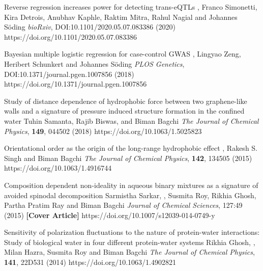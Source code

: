 


\begin{cvpubs}

%
        {Reverse regression increases power for detecting trans-eQTLs}
        {\selfauthor{}, Franco Simonetti, Kira Detrois, Anubhav Kaphle, Raktim Mitra, Rahul Nagial and Johannes S\"oding}
        {{\slshape bioRxiv}, DOI:10.1101/2020.05.07.083386 (2020)}
        {https://doi.org/10.1101/2020.05.07.083386}

%
        {Bayesian multiple logistic regression for case-control GWAS}
        {\selfauthor{}, Lingyao Zeng, Heribert Schunkert and Johannes S\"oding}
        {{\slshape PLOS Genetics}, DOI:10.1371/journal.pgen.1007856 (2018)}
        {https://doi.org/10.1371/journal.pgen.1007856}

%
        {Study of distance dependence of hydrophobic force between two graphene-like walls and a signature of pressure induced structure formation in the confined water}
        {Tuhin Samanta, Rajib Biswas, \selfauthor{} and Biman Bagchi}
        {{\slshape The Journal of Chemical Physics}, {\bfseries 149}, 044502 (2018)}
        {https://doi.org/10.1063/1.5025823}

%
        {Orientational order as the origin of the long-range hydrophobic effect}
        {\selfauthor{}, Rakesh S. Singh and Biman Bagchi}
        {{\slshape The Journal of Chemical Physics}, {\bfseries 142}, 134505 (2015)}
        {https://doi.org/10.1063/1.4916744}

%
        {Composition dependent non-ideality in aqueous binary mixtures
        as a signature of avoided spinodal decomposition}
        {Sarmistha Sarkar, \selfauthor{}, Susmita Roy, Rikhia Ghosh, Partha Pratim Ray and Biman Bagchi}
        {{\slshape Journal of Chemical Sciences}, 127:49 (2015) {\bfseries [Cover Article]}}
        {https://doi.org/10.1007/s12039-014-0749-y}

%
        {Sensitivity of polarization fluctuations to the nature of protein-water interactions:
        Study of biological water in four different protein-water systems}
        {Rikhia Ghosh, \selfauthor{}, Milan Hazra, Susmita Roy and Biman Bagchi}
        {{\slshape The Journal of Chemical Physics}, {\bfseries 141}, 22D531 (2014)}
        {https://doi.org/10.1063/1.4902821}


\end{cvpubs}
